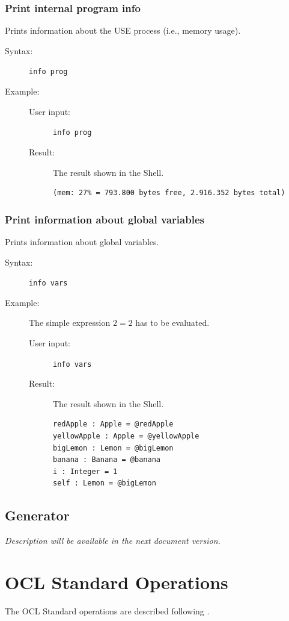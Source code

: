 \documentclass[a4paper,titlepage,oneside,final]{scrreprt} %
\begin{document}
\subsection{Print internal program info}
Prints information about the USE process (i.e., memory usage).
\begin{description}
\item[Syntax:] \verb+info prog+
\item[Example:]
\begin{description}
\item[User input:]\verb+info prog+
\item[Result:] The result shown in the Shell.
\begin{verbatim}
(mem: 27% = 793.800 bytes free, 2.916.352 bytes total)
\end{verbatim}
\end{description}
\end{description}
\subsection{Print information about global variables}
Prints information about global variables.
\begin{description}
\item[Syntax:] \verb+info vars+
\item[Example:] The simple expression $2=2$ has to be evaluated.
\begin{description}
\item[User input:]\verb+info vars+
\item[Result:] The result shown in the Shell.
\begin{verbatim}
redApple : Apple = @redApple
yellowApple : Apple = @yellowApple
bigLemon : Lemon = @bigLemon
banana : Banana = @banana
i : Integer = 1
self : Lemon = @bigLemon
\end{verbatim}
\end{description}
\end{description}
\section{Generator}
\emph{Description will be available in the next document version.}
\chapter{OCL Standard Operations}
The OCL Standard operations are described following \cite{kyas:phd}.



\end{document}
